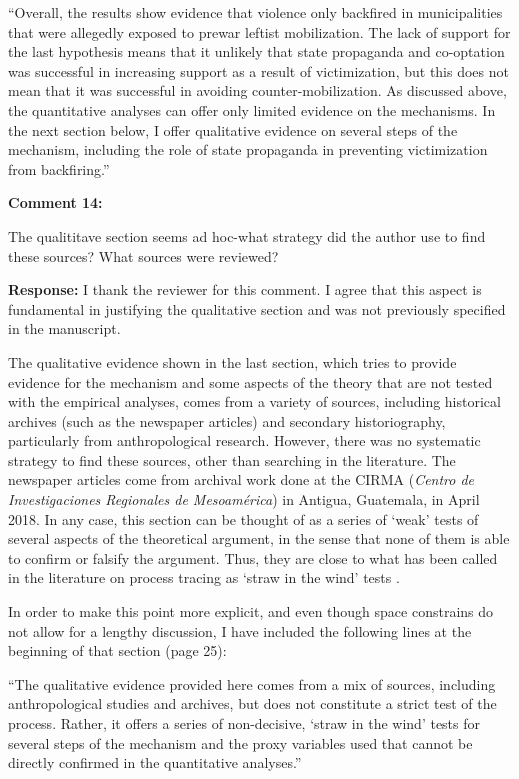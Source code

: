 \documentclass[12pt, a4paper, notitlepage]{article}
\begin{document}
``Overall, the results show evidence that violence only backfired in municipalities that were allegedly exposed to prewar leftist mobilization.
The lack of support for the last hypothesis means that it unlikely that state propaganda and co-optation was successful in increasing support as a result of victimization, but this does not mean that it was successful in avoiding counter-mobilization.
As discussed above, the quantitative analyses can offer only limited evidence on the mechanisms.
In the next section below, I offer qualitative evidence on several steps of the mechanism, including the role of state propaganda in preventing victimization from backfiring.''

\vspace{15pt}
\noindent\textbf{Comment 14:}
\begin{displayquote}
The qualititave section seems ad hoc-what strategy did the author use to find these sources? What sources were reviewed?
\end{displayquote}


\noindent\textbf{Response:} I thank the reviewer for this comment. I agree that this aspect is fundamental in justifying the qualitative section and was not previously specified in the manuscript.

The qualitative evidence shown in the last section, which tries to provide evidence for the mechanism and some aspects of the theory that are not tested with the empirical analyses, comes from a variety of sources, including historical archives (such as the newspaper articles) and secondary historiography, particularly from anthropological research. However, there was no systematic strategy to find these sources, other than searching in the literature. The newspaper articles come from archival work done at the CIRMA (\textit{Centro de Investigaciones Regionales de Mesoamérica}) in Antigua, Guatemala, in April 2018.
In any case, this section can be thought of as a series of `weak' tests of several aspects of the theoretical argument, in the sense that none of them is able to confirm or falsify the argument. Thus, they are close to what has been called in the literature on process tracing as `straw in the wind' tests \citep{Collier:2011ve}.

In order to make this point more explicit, and even though space constrains do not allow for a lengthy discussion, I have included the following lines at the beginning of that section (page 25):

``The qualitative evidence provided here comes from a mix of sources, including anthropological studies and archives, but does not constitute a strict test of the process.
Rather, it offers a series of non-decisive, `straw in the wind' tests \citep{Collier:2011ve} for several steps of the mechanism and the proxy variables used that cannot be directly confirmed in the quantitative analyses.''



\end{document}
